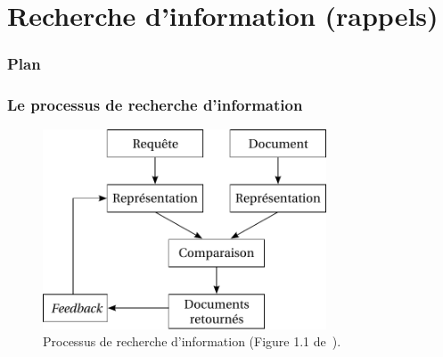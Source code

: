 \documentclass[12pt,aspectratio=43,dvipsnames,table]{beamer}
\begin{document}
\section{Recherche d'information (rappels)}


\begin{frame}
\frametitle{Plan}
\tableofcontents[sectionstyle=show,subsectionstyle=hide,subsubsectionstyle=hide]
\end{frame}


\begin{frame}
    \frametitle{Le processus de recherche d'information}
    \begin{figure}
    \centering
    \includegraphics[width=0.75\textwidth]{img/typicalIR.pdf}
    \caption{Processus de recherche d'information (Figure 1.1 
             de~\cite{DBLP:series/synthesis/2010Nie}).}
    \end{figure}
\end{frame}
\end{document}
